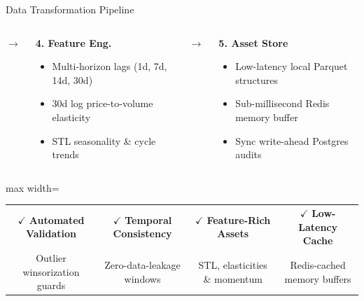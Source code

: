 \documentclass{beamer}
\begin{document}
\begin{frame}{Data Transformation Pipeline}
\begin{columns}[T]
    \centering \vspace{0.6cm} \textcolor{primaryLight}{\tiny $\rightarrow$}

    \begin{smallcard}[0.98\textwidth]
        \centering
        \textbf{\textcolor{primaryDark}{4. Feature Eng.}}
        \vspace{0.05cm}
        \begin{itemize}
            \fontsize{4.2pt}{4.8pt}\selectfont
            \item Multi-horizon lags (1d, 7d, 14d, 30d)
            \item 30d log price-to-volume elasticity
            \item STL seasonality \& cycle trends
        \end{itemize}
    \end{smallcard}

    \centering \vspace{0.6cm} \textcolor{primaryLight}{\tiny $\rightarrow$}

    \begin{smallcard}[0.98\textwidth]
        \centering
        \textbf{\textcolor{accentTeal}{5. Asset Store}}
        \vspace{0.05cm}
        \begin{itemize}
            \fontsize{4.2pt}{4.8pt}\selectfont
            \item Low-latency local Parquet structures
            \item Sub-millisecond Redis memory buffer
            \item Sync write-ahead Postgres audits
        \end{itemize}
    \end{smallcard}
\end{columns}

\vspace{0.25cm}

\begin{herocard}[0.98\textwidth]
    \begin{adjustbox}{max width=\linewidth}
    \centering \scriptsize
    \begin{tabular}{cccc}
        $\checkmark$ \textbf{Automated Validation} & 
        $\checkmark$ \textbf{Temporal Consistency} & 
        $\checkmark$ \textbf{Feature-Rich Assets} & 
        $\checkmark$ \textbf{Low-Latency Cache} \\
        \tiny \textcolor{textMedium}{Outlier winsorization guards} & 
        \tiny \textcolor{textMedium}{Zero-data-leakage windows} & 
        \tiny \textcolor{textMedium}{STL, elasticities \& momentum} & 
        \tiny \textcolor{textMedium}{Redis-cached memory buffers}
    \end{tabular}
    \end{adjustbox}
\end{herocard}
\end{frame}
\end{document}
